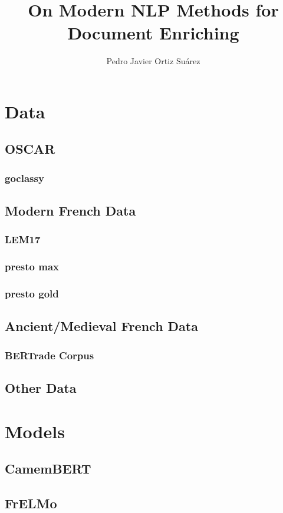 \documentclass{mimosis}
\title{On Modern NLP Methods for Document Enriching}
\author{Pedro Javier Ortiz Suárez}
\begin{document}
\frontmatter



\tableofcontents

\mainmatter




\part{Data}
\chapter{OSCAR}
\section{goclassy}
\chapter{Modern French Data}
\section{LEM17}
\section{presto max}
\section{presto gold}
\chapter{Ancient/Medieval French Data}
\section{BERTrade Corpus}
\chapter{Other Data}

\part{Models}
\chapter{CamemBERT}
\chapter{FrELMo}
\end{document}
